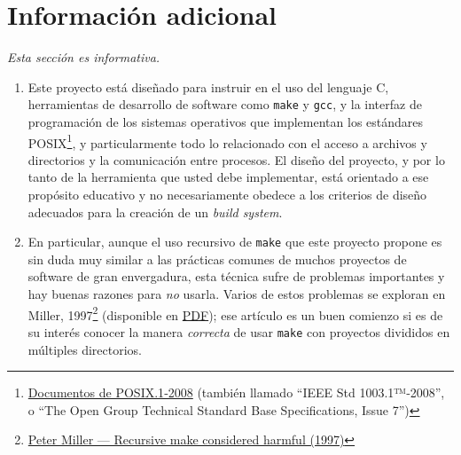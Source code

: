 \documentclass[]{article}
\begin{document}
\section{Información adicional}

\emph{Esta sección es informativa.}

\begin{enumerate}[1.]
\item
  Este proyecto está diseñado para instruir en el uso del lenguaje C,
  herramientas de desarrollo de software como \texttt{make} y
  \texttt{gcc}, y la interfaz de programación de los sistemas operativos
  que implementan los estándares POSIX\footnote{\href{http://pubs.opengroup.org/onlinepubs/9699919799}{Documentos
    de POSIX.1‐2008} (también llamado ``IEEE Std 1003.1™‐2008'', o ``The
    Open Group Technical Standard Base Specifications, Issue 7'')}, y
  particularmente todo lo relacionado con el acceso a archivos y
  directorios y la comunicación entre procesos. El diseño del proyecto,
  y por lo tanto de la herramienta que usted debe implementar, está
  orientado a ese propósito educativo y no necesariamente obedece a los
  criterios de diseño adecuados para la creación de un \emph{build
  system}.
\item
  En particular, aunque el uso recursivo de \texttt{make} que este
  proyecto propone es sin duda muy similar a las prácticas comunes de
  muchos proyectos de software de gran envergadura, esta técnica sufre
  de problemas importantes y hay buenas razones para \emph{no} usarla.
  Varios de estos problemas se exploran en Miller, 1997\footnote{\href{http://miller.emu.id.au/pmiller/books/rmch/}{Peter
    Miller --- Recursive make considered harmful (1997)}} (disponible en
  \href{http://aegis.sourceforge.net/auug97.pdf}{PDF}); ese artículo es
  un buen comienzo si es de su interés conocer la manera \emph{correcta}
  de usar \texttt{make} con proyectos divididos en múltiples
  directorios.
\end{enumerate}
\end{document}
